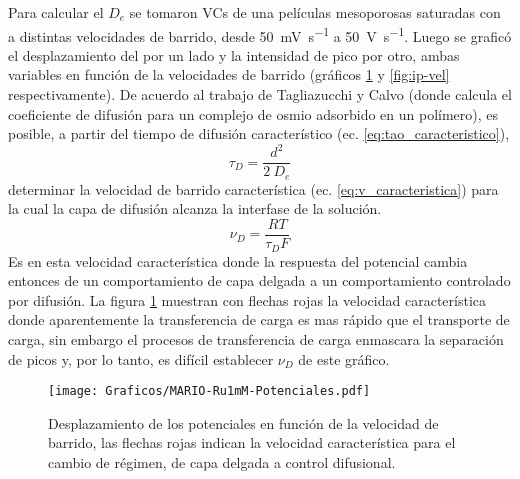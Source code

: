 	   	 Para calcular el $D_e$ se tomaron VCs de una películas mesoporosas saturadas con \ru\space a distintas velocidades de barrido, desde \SI{50}{\milli\volt\per\second} a \SI{50}{\volt\per\second}. Luego se graficó el desplazamiento del por un lado y la intensidad de pico por otro, ambas variables en función de la velocidades de barrido (gráficos \ref{fig:corrimiento-potenciales} y \ref{fig:ip-vel} respectivamente). De acuerdo al trabajo de Tagliazucchi y Calvo\cite{Tagliazucchi2010a} (donde calcula el coeficiente de difusión para un complejo de osmio adsorbido en un polímero), es posible, a partir del tiempo de difusión característico (ec. \ref{eq:tao_caracteristico}),\hfill
	   		\begin{equation}
					\tau_{\scriptscriptstyle{D}}=\frac{d^2}{2\ D_e}
					\label{eq:tao_caracteristico}
			 \end{equation}
	   	 determinar la velocidad de barrido característica (ec. \ref{eq:v_caracteristica}) para la cual la capa de difusión alcanza la interfase de la solución.  
 		   	 \begin{equation}
					\nu_{\scriptscriptstyle{D}}=\frac{RT}{\tau_{\scriptscriptstyle{D}}F}
					\label{eq:v_caracteristica}
			 \end{equation}
		 Es en esta velocidad característica donde la respuesta del potencial cambia entonces de un comportamiento de capa delgada a un comportamiento controlado por difusión. La figura \ref{fig:corrimiento-potenciales} muestran con flechas rojas la velocidad característica donde aparentemente la transferencia de carga es mas rápido que el transporte de carga, sin embargo el procesos de transferencia de carga enmascara la separación de picos y, por lo tanto, es difícil establecer $\nu_{\scriptscriptstyle{D}}$ de este gráfico.
			 \begin{figure}[ht]
					\centering
			 	    \texttt{[image: Graficos/MARIO-Ru1mM-Potenciales.pdf]}
			        \caption[Desplazamiento de potenciales]{Desplazamiento de los potenciales en función de la velocidad de barrido, las flechas rojas indican la velocidad característica para el cambio de régimen, de capa delgada a control difusional.}
			        \label{fig:corrimiento-potenciales}
			      	\end{figure}
